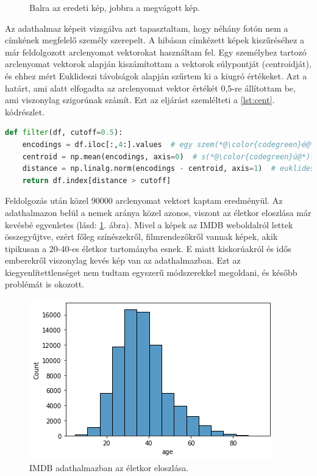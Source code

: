 \begin{figure}[ht]
\begin{subfigure}[b]{0.42\columnwidth}
     \end{subfigure}
        \caption{Balra az eredeti kép, jobbra a megvágott kép.}
\end{figure}


Az adathalmaz képeit vizsgálva azt tapasztaltam, hogy néhány fotón nem a címkének megfelelő személy szerepelt. A hibásan címkézett képek kiszűréséhez a már feldolgozott arclenyomat vektorokat használtam fel. Egy személyhez tartozó arclenyomat vektorok alapján kiszámítottam a vektorok súlypontját (centroidját), és ehhez mért Euklideszi távolságok alapján szűrtem ki a kiugró értékeket. Azt a határt, ami alatt elfogadta az arclenyomat vektor értékét 0,5-re állítottam be, ami viszonylag szigorúnak számít. Ezt az eljárást szemlélteti a \ref{lst:cent}. kódrészlet.

\begin{lstlisting}[language=python, caption={Arclenyomatok szűrése távolság alapján.}, label=lst:cent]
def filter(df, cutoff=0.5):
	encodings = df.iloc[:,4:].values  # egy szem(*@\color{codegreen}é@*)lyhez tartoz(*@\color{codegreen}ó@*) arclenyomatok
	centroid = np.mean(encodings, axis=0)  # s(*@\color{codegreen}ú@*)lypont sz(*@\color{codegreen}á@*)m(*@\color{codegreen}í@*)t(*@\color{codegreen}á@*)s
	distance = np.linalg.norm(encodings - centroid, axis=1)  # euklideszi t(*@\color{codegreen}á@*)vols(*@\color{codegreen}á@*)g
	return df.index[distance > cutoff]
\end{lstlisting}

Feldolgozás után közel 90000 arclenyomat vektort kaptam eredményül. Az adathalmazon belül a nemek aránya közel azonos, viszont az életkor eloszlása már kevésbé egyenletes (lásd: \ref{fig:agedist}. ábra). Mivel a képek az IMDB weboldalról lettek összegyűjtve, ezért főleg színészekről, filmrendezőkről vannak képek, akik tipikusan a 20-40-es életkor tartományba esnek. E miatt kiskorúakról és idős emberekről viszonylag kevés kép van az adathalmazban. Ezt az kiegyenlítettlenséget nem tudtam egyszerű módszerekkel megoldani, és később problémát is okozott.

\begin{figure}[ht]
	\centering
	\includegraphics[width=0.7\columnwidth]{figures/IMDB_age_dist.png}
	\caption{IMDB adathalmazban az életkor eloszlása.}
	\label{fig:agedist}
\end{figure}

